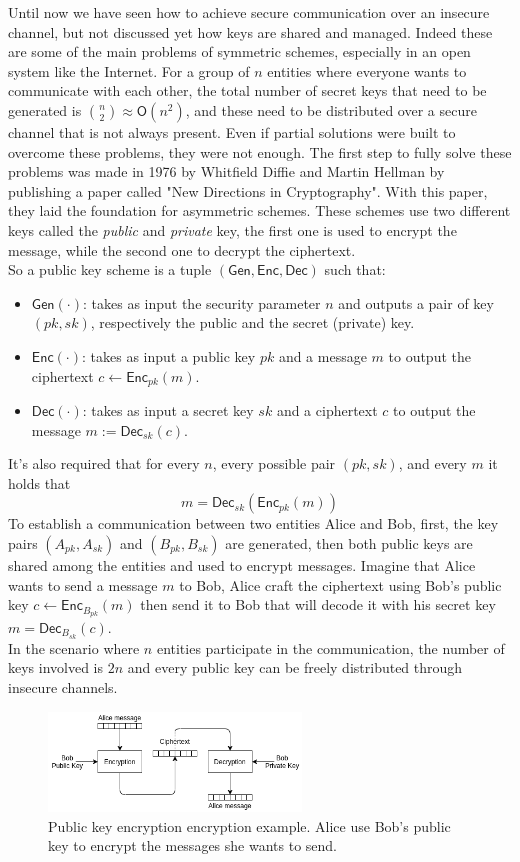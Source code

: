Until now we have seen how to achieve secure communication  over an insecure channel, but not discussed yet how keys are shared and managed. Indeed these are some of the main problems of symmetric schemes, especially in an open system like the Internet. For a group of $n$ entities where everyone wants to communicate with each other, the total number of secret keys that need to be generated is $\binom{n}{2} \approx \mathsf{O}(n^2)$, and these need to be distributed over a secure channel that is not always present.
Even if partial solutions were built to overcome these problems, they were not enough.
The first step to fully solve these problems was made in 1976 by Whitfield Diffie and Martin Hellman by publishing a paper called "New Directions in Cryptography". With this paper, they laid the foundation for asymmetric schemes. These schemes use two different keys called the \emph{public} and \emph{private} key, the first one is used to encrypt the message, while the second one to decrypt the ciphertext.\\
So a public key scheme is a tuple $(\mathsf{Gen}, \mathsf{Enc}, \mathsf{Dec})$ such that:
\begin{itemize}
    \item{$\mathsf{Gen}(\cdot)$: takes as input the security parameter $n$ and outputs a pair of key $(pk, sk)$, respectively the public and the secret (private) key.}
    \item{$\mathsf{Enc}(\cdot)$: takes as input a public key $pk$ and a message $m$ to output the ciphertext $c \leftarrow \mathsf{Enc}_{pk}(m)$.}
    \item{$\mathsf{Dec}(\cdot)$: takes as input a secret key $sk$ and a ciphertext $c$ to output the message $m := \mathsf{Dec}_{sk}(c)$.}
\end{itemize}
It's also required that for every $n$, every possible pair $(pk, sk)$, and every $m$ it holds that
$$
m = \mathsf{Dec}_{sk}(\mathsf{Enc}_{pk}(m))
$$
To establish a communication between two entities Alice and Bob, first, the key pairs $(A_{pk}, A_{sk})$ and $(B_{pk}, B_{sk})$ are generated, then both public keys are shared among the entities and used to encrypt messages. Imagine that Alice wants to send a message $m$ to Bob, Alice craft the ciphertext using Bob's public key $c \leftarrow  \mathsf{Enc}_{B_{pk}}(m)$ then send it to Bob that will decode it with his secret key\\$m = \mathsf{Dec}_{B_{sk}}(c)$.\\
In the scenario where $n$ entities participate in the communication, the number of keys involved is $2n$ and every public key can be freely distributed through insecure channels.
\begin{figure}[H]
    \centering
    \includegraphics[width=0.6\textwidth]{img/public-key/encryption.png}
    \caption[Public key encryption encryption example.]{Public key encryption encryption example. Alice use Bob's public key to encrypt the messages she wants to send.}
\end{figure}
